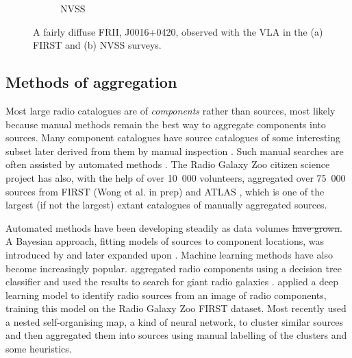 \documentclass[11pt, a4paper]{book}
\providecommand{\DIFaddtex}[1]{{\protect\color{blue}\uwave{#1}}} %
\providecommand{\DIFdeltex}[1]{{\protect\color{red}\sout{#1}}}                      %
\providecommand{\DIFaddbegin}{} %
\providecommand{\DIFaddend}{} %
\providecommand{\DIFdelbegin}{} %
\providecommand{\DIFdelend}{} %
\providecommand{\DIFadd}[1]{\texorpdfstring{\DIFaddtex{#1}}{#1}} %
\providecommand{\DIFdel}[1]{\texorpdfstring{\DIFdeltex{#1}}{}} %
\newcommand{\DIFscaledelfig}{0.5}
\newlength{\DIFdelgraphicswidth} %
\newlength{\DIFdelgraphicsheight} %
\newcommand{\DIFaddincludegraphics}[2][]{{\color{blue}\fbox{\DIFOincludegraphics[#1]{#2}}}} %
\newcommand{\DIFdelincludegraphics}[2][]{%
\sbox{\DIFdelgraphicsbox}{\DIFOincludegraphics[#1]{#2}}%
\settoboxwidth{\DIFdelgraphicswidth}{\DIFdelgraphicsbox} %
\settoboxtotalheight{\DIFdelgraphicsheight}{\DIFdelgraphicsbox} %
\scalebox{\DIFscaledelfig}{%
\parbox[b]{\DIFdelgraphicswidth}{\usebox{\DIFdelgraphicsbox}\\[-\baselineskip] \rule{\DIFdelgraphicswidth}{0em}}\llap{\resizebox{\DIFdelgraphicswidth}{\DIFdelgraphicsheight}{%
\setlength{\unitlength}{\DIFdelgraphicswidth}%
\begin{picture}(1,1)%
\thicklines\linethickness{2pt} %
{\color[rgb]{1,0,0}\put(0,0){\framebox(1,1){}}}%
{\color[rgb]{1,0,0}\put(0,0){\line( 1,1){1}}}%
{\color[rgb]{1,0,0}\put(0,1){\line(1,-1){1}}}%
\end{picture}%
}\hspace*{3pt}}} %
} %
\DeclareRobustCommand{\DIFaddbegin}{\DIFOaddbegin \let\includegraphics\DIFaddincludegraphics} %
\DeclareRobustCommand{\DIFaddend}{\DIFOaddend \let\includegraphics\DIFOincludegraphics} %
\DeclareRobustCommand{\DIFdelbegin}{\DIFOdelbegin \let\includegraphics\DIFdelincludegraphics} %
\DeclareRobustCommand{\DIFdelend}{\DIFOaddend \let\includegraphics\DIFOincludegraphics} %
\begin{document}
\begin{figure}
\begin{subfigure}{0.45\textwidth}
                \caption{NVSS}
                \label{fig:im-contours-nvss}
            \end{subfigure}
            \caption[An example of a `resolved out' radio galaxy.]{\label{fig:resolved-out} A fairly diffuse FRII, J0016+0420, observed with the VLA in the (a) FIRST \citep{becker95first} and (b) NVSS \citep{condon98nvss} surveys. \citep[GRG1 from ][]{dabhade_discovery_2017}}
        \end{figure}

    \subsection{Methods of aggregation}
    \label{sec:methods-aggregation}

        Most large radio catalogues are of \emph{components} rather than sources, most likely because manual methods remain the best way to aggregate components into sources. Many component catalogues have source catalogues of some interesting subset later derived from them by manual inspection \citep[e.g.][]{dabhade_discovery_2017}. Such manual searches are often assisted by automated methods \citep[e.g.][]{proctor_morphological_2011}. The Radio Galaxy Zoo citizen science project has also, with the help of over 10~000 volunteers, aggregated over 75~000 sources from FIRST (Wong et al. in prep\DIFaddbegin \DIFadd{.}\DIFaddend ) and ATLAS \citep{banfield15}, which is one of the largest (if not the largest) extant catalogues of manually aggregated sources.

        Automated methods have been developing steadily as data volumes \DIFdelbegin \DIFdel{have grown}\DIFdelend \DIFaddbegin \DIFadd{grow}\DIFaddend . A Bayesian approach, fitting models of sources to component locations, was introduced by \citet{fan15} and later expanded upon \citep{fan_optimal_2020}. Machine learning methods have also become increasingly popular. \citet{proctor_selection_2016} aggregated radio components using a decision tree classifier and used the results to search for giant radio galaxies \citep[see also][]{proctor_morphological_2011,proctor06}. \citet{wu19claran} applied a deep learning model to identify radio sources from an image of radio components, training this model on the Radio Galaxy Zoo FIRST dataset. Most recently \citet{galvin_cataloguing_2020} used a nested self-organising map, a kind of neural network, to cluster similar sources and then aggregated them into sources using manual labelling of the clusters and some heuristics.
\end{document}

